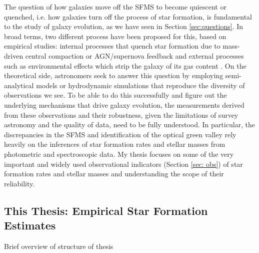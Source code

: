 The question of how galaxies move off the SFMS to become quiescent or quenched, i.e. how galaxies turn off the process of star formation, is fundamental to the study of galaxy evolution, as we have seen in Section \ref{sec:questions}. In broad terms, two different process have been proposed for this, based on empirical studies: internal processes that quench star formation due to mass-driven central compaction or AGN/supernova feedback \citep{peng_mass_2010}  and external processes such as environmental effects which strip the galaxy of its gas content \citep{peng_mass_2012, 2012ApJ...757...85G}. On the theoretical side, astronomers seek to answer this question by employing semi-analytical models or hydrodynamic simulations that reproduce the diversity of observations we see. To be able to do this successfully and figure out the underlying mechanisms that drive galaxy evolution, the measurements derived from these observations and their robustness, given the limitations of survey astronomy and the quality of data, need to be fully understood. In particular, the discrepancies in the SFMS and identification of the optical green valley rely heavily on the inferences of star formation rates and stellar masses from photometric and spectroscopic data. My thesis focuses on some of the very important and widely used observational indicators (Section \ref{sec: obs}) of star formation rates and stellar masses and understanding the scope of their reliability.\\

\subsection{This Thesis: Empirical Star Formation Estimates}
Brief overview of structure of thesis







